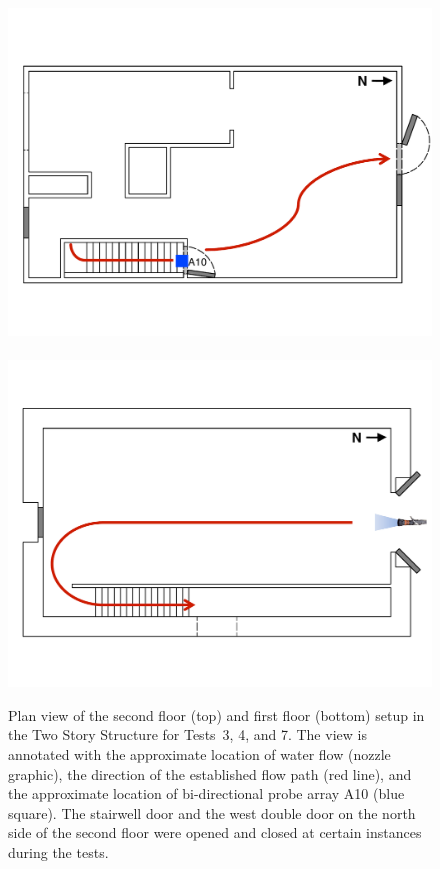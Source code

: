 \documentclass[12pt,oneside]{book}
\begin{document}
\begin{figure}[!ht]
	\includegraphics[width=\columnwidth]{../Figures/Floor_Plans/Specific_Tests/West_Hose_Test_2nd_Floor_Annotated}
	\\~\\
	\includegraphics[width=\columnwidth]{../Figures/Floor_Plans/Specific_Tests/West_Hose_Test_19_1st_Floor_Annotated}
	\caption[Plan view of the Two Story Structure setup for Tests~3 and 7.]{Plan view of the second floor (top) and first floor (bottom) setup in the Two Story Structure for Tests~3, 4, and 7. The view is annotated with the approximate location of water flow (nozzle graphic), the direction of the established flow path (red line), and the approximate location of bi-directional probe array A10 (blue square). The stairwell door and the west double door on the north side of the second floor were opened and closed at certain instances during the tests.}
	\label{fig:flow_path_2}
\end{figure}
\FloatBarrier
\end{document}
